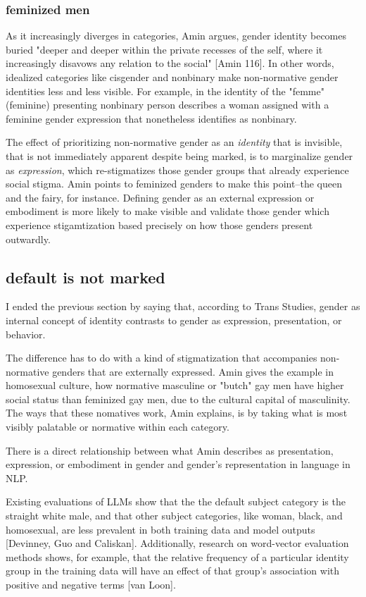 \documentclass[11pt]{article}
\begin{document}
\subsubsection{feminized men}
\label{sec:orge729014}
As it increasingly diverges in categories, Amin argues, gender
identity becomes buried "deeper and deeper within the private recesses
of the self, where it increasingly disavows any relation to the
social" [Amin 116]. In other words, idealized categories like
cisgender and nonbinary make non-normative gender identities less and
less visible. For example, in the identity of the "femme" (feminine)
presenting nonbinary person describes a woman assigned with a feminine
gender expression that nonetheless identifies as nonbinary.

The effect of prioritizing non-normative gender as an \emph{identity} that
is invisible, that is not immediately apparent despite being marked,
is to marginalize gender as \emph{expression}, which re-stigmatizes those
gender groups that already experience social stigma. Amin points to
feminized genders to make this point--the queen and the fairy, for
instance. Defining gender as an external expression or embodiment is
more likely to make visible and validate those gender which experience
stigamtization based precisely on how those genders present outwardly. 

\subsection{default is not marked}
\label{sec:orgf713d15}
I ended the previous section by saying that, according to Trans
Studies, gender as internal concept of identity contrasts to gender as
expression, presentation, or behavior.

The difference has to do with a kind of stigmatization that
accompanies non-normative genders that are externally expressed. Amin
gives the example in homosexual culture, how normative masculine or
"butch" gay men have higher social status than feminized gay men, due
to the cultural capital of masculinity. The ways that these nomatives
work, Amin explains, is by taking what is most visibly palatable or
normative within each category.

There is a direct relationship between what Amin describes as
presentation, expression, or embodiment in gender and gender's
representation in language in NLP. 

Existing evaluations of LLMs show that the the default subject
category is the straight white male, and that other subject
categories, like woman, black, and homosexual, are less prevalent in
both training data and model outputs [Devinney, Guo and Caliskan].
Additionally, research on word-vector evaluation methods shows, for
example, that the relative frequency of a particular identity group in
the training data will have an effect of that group's association with
positive and negative terms [van Loon].
\end{document}
